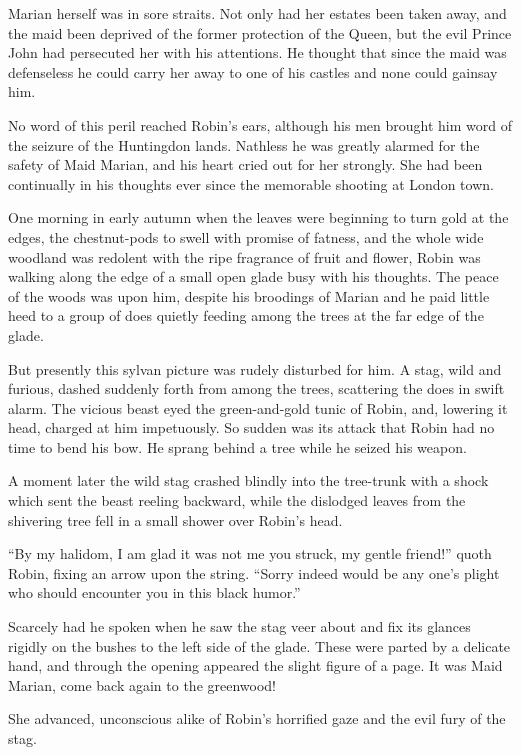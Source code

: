 Marian herself was in sore straits. Not only had her estates been taken
away, and the maid been deprived of the former protection of the Queen,
but the evil Prince John had persecuted her with his attentions. He
thought that since the maid was defenseless he could carry her away to
one of his castles and none could gainsay him.

No word of this peril reached Robin's ears, although his men brought him
word of the seizure of the Huntingdon lands. Nathless he was greatly
alarmed for the safety of Maid Marian, and his heart cried out for her
strongly. She had been continually in his thoughts ever since the
memorable shooting at London town.

One morning in early autumn when the leaves were beginning to turn gold
at the edges, the chestnut-pods to swell with promise of fatness, and
the whole wide woodland was redolent with the ripe fragrance of fruit
and flower, Robin was walking along the edge of a small open glade busy
with his thoughts. The peace of the woods was upon him, despite his
broodings of Marian and he paid little heed to a group of does quietly
feeding among the trees at the far edge of the glade.

But presently this sylvan picture was rudely disturbed for him. A stag,
wild and furious, dashed suddenly forth from among the trees, scattering
the does in swift alarm. The vicious beast eyed the green-and-gold tunic
of Robin, and, lowering it head, charged at him impetuously. So sudden
was its attack that Robin had no time to bend his bow. He sprang behind
a tree while he seized his weapon.

A moment later the wild stag crashed blindly into the tree-trunk with a
shock which sent the beast reeling backward, while the dislodged leaves
from the shivering tree fell in a small shower over Robin's head.

``By my halidom, I am glad it was not me you struck, my gentle friend!''
quoth Robin, fixing an arrow upon the string. ``Sorry indeed would be
any one's plight who should encounter you in this black humor.''

Scarcely had he spoken when he saw the stag veer about and fix its
glances rigidly on the bushes to the left side of the glade. These were
parted by a delicate hand, and through the opening appeared the slight
figure of a page. It was Maid Marian, come back again to the greenwood!

She advanced, unconscious alike of Robin's horrified gaze and the evil
fury of the stag.

